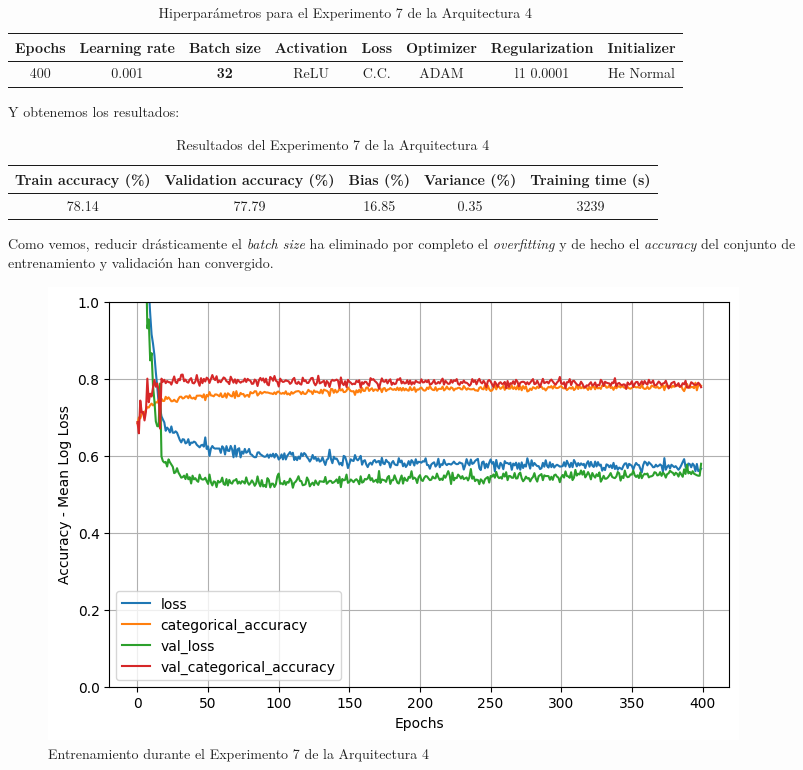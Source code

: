 \documentclass{article}
\begin{document}
			\begin{table}[!h]
				\begin{tabular}{|c|c|c|c|c|c|c|c|}
					\textbf{Epochs}&\textbf{Learning rate}&\textbf{Batch size}&\textbf{Activation}&\textbf{Loss}&\textbf{Optimizer}&\textbf{Regularization}  & \textbf{Initializer} \\ \hline
					400 & 0.001 & \textbf{32} & ReLU & C.C. & ADAM & l1 0.0001 & He Normal
				\end{tabular}
				\caption{Hiperpar\'ametros para el Experimento 7 de la Arquitectura 4}
				\label{tab:hip-d-a4-e7}
			\end{table}
			Y obtenemos los resultados:
			\begin{table}[!h]
				\begin{center}
					\begin{tabular}{| c | c | c | c | c |}
						\textbf{Train accuracy (\%)} & \textbf{Validation accuracy (\%)} & \textbf{Bias (\%)} & \textbf{Variance (\%)} & \textbf{Training time (s)} \\ \hline
						78.14 & 77.79 & 16.85 & 0.35 & 3239 \\ \hline
					\end{tabular}
					\caption{Resultados del Experimento 7 de la Arquitectura 4}
					\label{tab:res-d-a4-e7}
				\end{center}
			\end{table}
   
			Como vemos, reducir dr\'asticamente el \textit{batch size} ha eliminado por completo el \textit{overfitting} y de hecho el \textit{accuracy} del conjunto de entrenamiento y validaci\'on han convergido.
			\begin{figure}[!h]
				\begin{center}
					\includegraphics[scale=0.4]{d-tr-a4-e7.png}		
					\caption{Entrenamiento durante el Experimento 7 de la Arquitectura 4}	
					\label{d-tr-a4-e7}
				\end{center}
			\end{figure}
\end{document}
